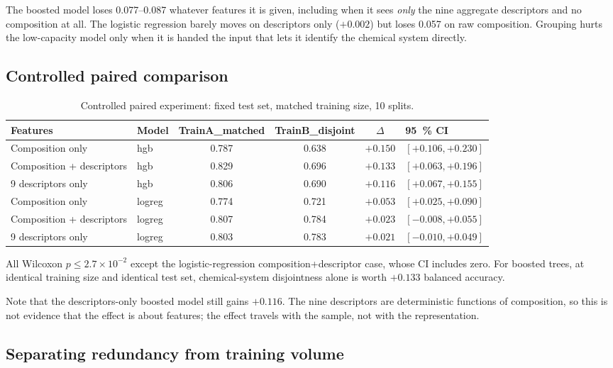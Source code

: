 \documentclass[11pt]{article}
\begin{document}
The boosted model loses 0.077--0.087 whatever features it is given, including when it sees \emph{only} the nine aggregate descriptors and no composition at all. The logistic regression barely moves on descriptors only ($+0.002$) but loses 0.057 on raw composition. Grouping hurts the low-capacity model only when it is handed the input that lets it identify the chemical system directly.

\subsection{Controlled paired comparison}

\begin{table}[t]
\centering
\caption{Controlled paired experiment: fixed test set, matched training size, 10 splits.}
\label{tab:paired}
\small
\begin{tabular}{llcccl}
\toprule
Features & Model & TrainA\_matched & TrainB\_disjoint & $\Delta$ & \SI{95}{\percent} CI \\
\midrule
Composition only          & hgb    & 0.787 & 0.638 & $+0.150$ & $[+0.106, +0.230]$ \\
Composition + descriptors & hgb    & 0.829 & 0.696 & $+0.133$ & $[+0.063, +0.196]$ \\
9 descriptors only        & hgb    & 0.806 & 0.690 & $+0.116$ & $[+0.067, +0.155]$ \\
Composition only          & logreg & 0.774 & 0.721 & $+0.053$ & $[+0.025, +0.090]$ \\
Composition + descriptors & logreg & 0.807 & 0.784 & $+0.023$ & $[-0.008, +0.055]$ \\
9 descriptors only        & logreg & 0.803 & 0.783 & $+0.021$ & $[-0.010, +0.049]$ \\
\bottomrule
\end{tabular}
\end{table}

All Wilcoxon $p \le 2.7\times10^{-2}$ except the logistic-regression composition+descriptor case, whose CI includes zero. For boosted trees, at identical training size and identical test set, chemical-system disjointness alone is worth $+0.133$ balanced accuracy.

Note that the descriptors-only boosted model still gains $+0.116$. The nine descriptors are deterministic functions of composition, so this is not evidence that the effect is about features; the effect travels with the sample, not with the representation.

\subsection{Separating redundancy from training volume}
\end{document}
